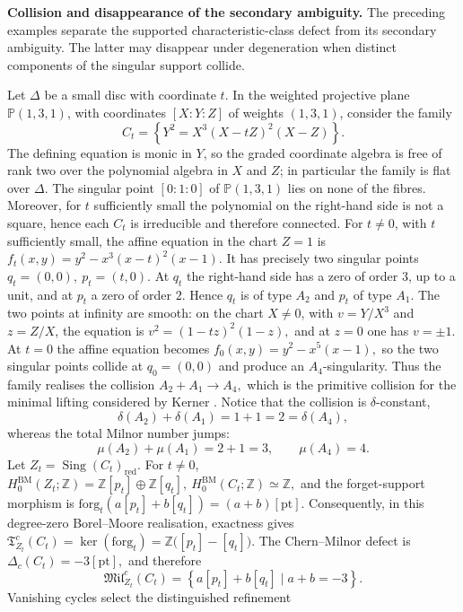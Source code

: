 \documentclass[10pt,a4paper,dvipsnames,x11names]{amsart}
\newcommand{\forg}{\mathrm{forg}}
\newcommand{\TLoc}{\mathfrak T}
\numberwithin{equation}{section}
\theoremstyle{plain}
\theoremstyle{definition}
\theoremstyle{remark}
\begin{document}
\medskip
\noindent\textbf{Collision and disappearance of the secondary ambiguity.}
The preceding examples separate the supported characteristic-class defect from its secondary ambiguity. The latter may disappear under degeneration when distinct components of the singular support collide.

Let $\Delta$ be a small disc with coordinate $t$.  In the weighted projective plane $\mathbb P(1,3,1)$, with coordinates $[X:Y:Z]$ of weights $(1,3,1)$, consider the family
\[
C_t=\left\{Y^2=X^3(X-tZ)^2(X-Z)\right\}.
\]
The defining equation is monic in $Y$, so the graded coordinate algebra is free of rank two over the polynomial algebra in $X$ and $Z$; in particular the family is flat over $\Delta$.  The singular point $[0:1:0]$ of $\mathbb P(1,3,1)$ lies on none of the fibres.  Moreover, for $t$ sufficiently small the polynomial on the right-hand side is not a square, hence each $C_t$ is irreducible and therefore connected.
For $t\neq0$, with $t$ sufficiently small, the affine equation in the chart $Z=1$ is
$
f_t(x,y)=y^2-x^3(x-t)^2(x-1).
$
It has precisely two singular points
$
q_t=(0,0),
\
p_t=(t,0).
$
At $q_t$ the right-hand side has a zero of order $3$, up to a unit, and at $p_t$ a zero of order $2$.  Hence $q_t$ is of type $A_2$ and $p_t$ of type $A_1$.  The two points at infinity are smooth: on the chart $X\neq0$, with $v=Y/X^3$ and $z=Z/X$, the equation is
$
v^2=(1-tz)^2(1-z),
$
and at $z=0$ one has $v=\pm1$.  At $t=0$ the affine equation becomes
$
f_0(x,y)=y^2-x^5(x-1),
$
so the two singular points collide at $q_0=(0,0)$ and produce an $A_4$-singularity.  Thus the family realises the collision
$
A_2+A_1\longrightarrow A_4,
$
which is the primitive collision for the minimal lifting considered by Kerner \cite{KernerCollisions}.  Notice that the collision is $\delta$-constant,
\[
\delta(A_2)+\delta(A_1)=1+1=2=\delta(A_4),
\]
whereas the total Milnor number jumps:
\[
\mu(A_2)+\mu(A_1)=2+1=3,
\qquad
\mu(A_4)=4.
\]
Let $Z_t=\operatorname{Sing}(C_t)_{\mathrm{red}}$.  For $t\neq0$,
$
H^{\mathrm{BM}}_0(Z_t;\mathbb Z)
=\mathbb Z[p_t]\oplus\mathbb Z[q_t],
\ 
H^{\mathrm{BM}}_0(C_t;\mathbb Z)\simeq\mathbb Z,
$
and the forget-support morphism is
$
\forg_t(a[p_t]+b[q_t])=(a+b)[\mathrm{pt}].
$
Consequently, in this degree-zero Borel--Moore realisation, exactness gives
$
\TLoc^c_{Z_t}(C_t)
=\ker(\forg_t)
=\mathbb Z\bigl([p_t]-[q_t]\bigr).
$
The Chern--Milnor defect is
$
\Delta_c(C_t)=-3[\mathrm{pt}],
$
and therefore
\[
\mathfrak{Mil}^c_{Z_t}(C_t)
=
\left\{a[p_t]+b[q_t]\mid a+b=-3\right\}.
\]
Vanishing cycles select the distinguished refinement
\end{document}
